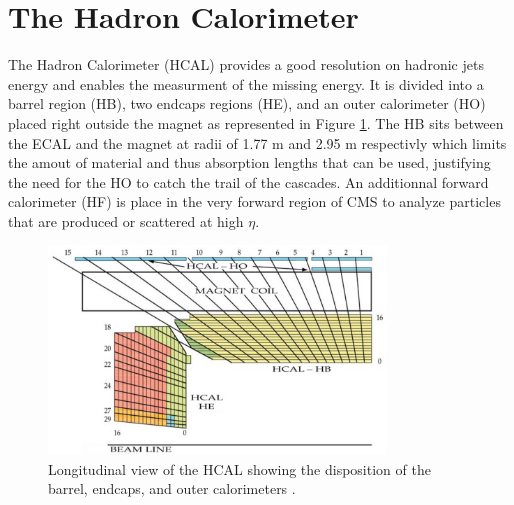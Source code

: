   \section{The Hadron Calorimeter}

    The Hadron Calorimeter (HCAL) provides a good resolution on hadronic jets energy and enables the measurment of the missing energy. It is divided into a barrel region (HB), two endcaps regions (HE), and an outer calorimeter (HO) placed right outside the magnet as represented in Figure \ref{fig:I-3-hcal}. The HB sits between the ECAL and the magnet at radii of 1.77 m and 2.95 m respectivly which limits the amout of material and thus absorption lengths that can be used, justifying the need for the HO to catch the trail of the cascades. An additionnal forward calorimeter (HF) is place in the very forward region of CMS to analyze particles that are produced or scattered at high $ \eta $. \\

    \begin{figure}[h!]
      \centering
      \includegraphics[width=0.8\textwidth]{img/I-3-cms/hcal.png}
      \caption{Longitudinal view of the HCAL showing the disposition of the barrel, endcaps, and outer calorimeters \cite{1748-0221-3-08-S08004}.}
      \label{fig:I-3-hcal}
    \end{figure}

